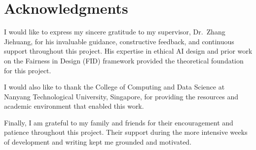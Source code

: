 \chapter*{Acknowledgments}

I would like to express my sincere gratitude to my supervisor, Dr.\ Zhang Jiehuang, for his invaluable guidance, constructive feedback, and continuous support throughout this project. His expertise in ethical AI design and prior work on the Fairness in Design (FID) framework provided the theoretical foundation for this project.

I would also like to thank the College of Computing and Data Science at Nanyang Technological University, Singapore, for providing the resources and academic environment that enabled this work.

Finally, I am grateful to my family and friends for their encouragement and patience throughout this project. Their support during the more intensive weeks of development and writing kept me grounded and motivated.
